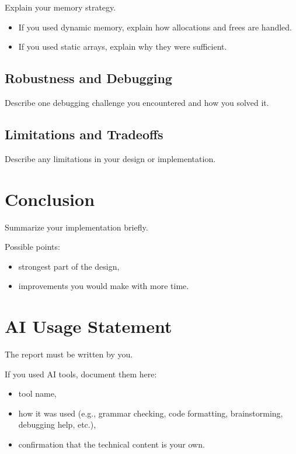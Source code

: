 \documentclass[a4paper,12pt]{article}
\begin{document}
Explain your memory strategy.

\begin{itemize}[leftmargin=1.5em]
\item If you used dynamic memory, explain how allocations and frees are handled.
\item If you used static arrays, explain why they were sufficient.
\end{itemize}

\subsection{Robustness and Debugging}

Describe one debugging challenge you encountered and how you solved it.

\subsection{Limitations and Tradeoffs}

Describe any limitations in your design or implementation.

\section{Conclusion}

Summarize your implementation briefly.

Possible points:
\begin{itemize}[leftmargin=1.5em]
\item strongest part of the design,
\item improvements you would make with more time.
\end{itemize}

\section*{AI Usage Statement}

The report must be written by you.

If you used AI tools, document them here:
\begin{itemize}[leftmargin=1.5em]
\item tool name,
\item how it was used (e.g., grammar checking, code formatting, brainstorming, debugging help, etc.),
\item confirmation that the technical content is your own.
\end{itemize}
\end{document}
